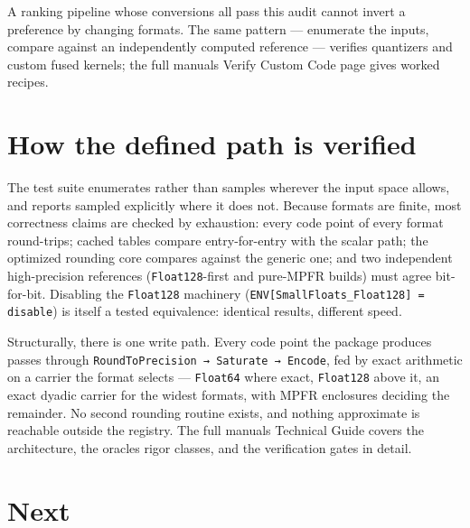A ranking pipeline whose conversions all pass this audit cannot invert a preference by changing formats. The same pattern — enumerate the inputs, compare against an independently computed reference — verifies quantizers and custom fused kernels; the full manual{\textquotesingle}s Verify Custom Code page gives worked recipes.



\section{How the defined path is verified}



\label{6804462531286882542}{}


The test suite enumerates rather than samples wherever the input space allows, and reports {\textquotedbl}sampled{\textquotedbl} explicitly where it does not. Because formats are finite, most correctness claims are checked by exhaustion: every code point of every format round-trips; cached tables compare entry-for-entry with the scalar path; the optimized rounding core compares against the generic one; and two independent high-precision references (\texttt{Float128}-first and pure-MPFR builds) must agree bit-for-bit. Disabling the \texttt{Float128} machinery (\texttt{ENV[{\textquotedbl}SmallFloats\_\allowbreak{}Float128{\textquotedbl}] = {\textquotedbl}disable{\textquotedbl}}) is itself a tested equivalence: identical results, different speed.



Structurally, there is one write path. Every code point the package produces passes through \texttt{RoundToPrecision → Saturate → Encode}, fed by exact arithmetic on a carrier the format selects — \texttt{Float64} where exact, \texttt{Float128} above it, an exact dyadic carrier for the widest formats, with MPFR enclosures deciding the remainder. No second rounding routine exists, and nothing approximate is reachable outside the registry. The full manual{\textquotesingle}s Technical Guide covers the architecture, the oracle{\textquotesingle}s rigor classes, and the verification gates in detail.



\section{Next}



\label{9862256287407127426-dup4}{}


